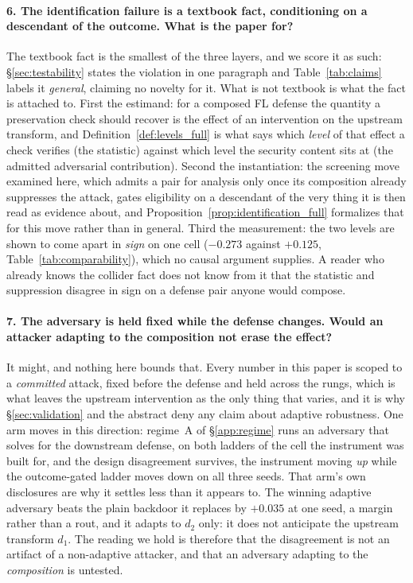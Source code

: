 \documentclass{article}
\begin{document}
\paragraph{6. The identification failure is a textbook fact, conditioning on a descendant of the outcome.
What is the paper for?} The textbook fact is the smallest of the three layers, and we score it as such:
§\ref{sec:testability} states the violation in one paragraph and Table~\ref{tab:claims} labels it
\emph{general}, claiming no novelty for it. What is not textbook is what the fact is attached to. First the
estimand: for a composed FL defense the quantity a preservation check should recover is the effect of an
intervention on the upstream transform, and Definition~\ref{def:levels_full} is what says which
\emph{level} of that effect a check verifies (the statistic) against which level the security content sits
at (the admitted adversarial contribution). Second the instantiation: the screening move examined here,
which admits a pair for analysis only once its composition already suppresses the attack, gates
eligibility on a descendant of the very thing it is then read as evidence about, and
Proposition~\ref{prop:identification_full} formalizes that for this move rather than in general. Third the
measurement: the two levels are shown to come apart in \emph{sign} on one cell ($-0.273$ against $+0.125$,
Table~\ref{tab:comparability}), which no causal argument supplies. A reader who already knows the collider
fact does not know from it that the statistic and suppression disagree in sign on a defense pair anyone
would compose.

\paragraph{7. The adversary is held fixed while the defense changes. Would an attacker adapting to the
composition not erase the effect?} It might, and nothing here bounds that. Every number in this paper is
scoped to a \emph{committed} attack, fixed before the defense and held across the rungs, which is what
leaves the upstream intervention as the only thing that varies, and it is why §\ref{sec:validation} and the
abstract deny any claim about adaptive robustness. One arm moves in this direction: regime~A of
§\ref{app:regime} runs an adversary that solves for the downstream defense, on both ladders of the cell the
instrument was built for, and the design disagreement survives, the instrument moving \emph{up} while the
outcome-gated ladder moves down on all three seeds. That arm's own disclosures are why it settles less than
it appears to. The winning adaptive adversary beats the plain backdoor it replaces by $+0.035$ at one seed,
a margin rather than a rout, and it adapts to $d_2$ only: it does not anticipate the upstream transform
$d_1$. The reading we hold is therefore that the disagreement is not an artifact of a non-adaptive
attacker, and that an adversary adapting to the \emph{composition} is untested.
\end{document}
